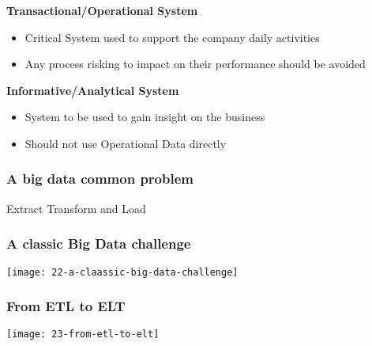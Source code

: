 \textbf{Transactional/Operational System}
\begin{itemize}
	\item Critical System used  to support the company daily activities
	\item Any process risking to impact on their performance should be avoided
\end{itemize}

\textbf{Informative/Analytical System}
\begin{itemize}
	\item System to be used to gain insight on the business
	\item Should not use Operational Data directly
\end{itemize}

\subsubsection{A big data common problem}
\begin{center}
\end{center}

Extract Transform and Load

\begin{center}
\end{center}

\subsubsection{A classic Big Data challenge}
\begin{center}
\texttt{[image: 22-a-claassic-big-data-challenge]}
\end{center}

\subsubsection{From ETL to ELT}

\begin{center}
\texttt{[image: 23-from-etl-to-elt]}
\end{center}